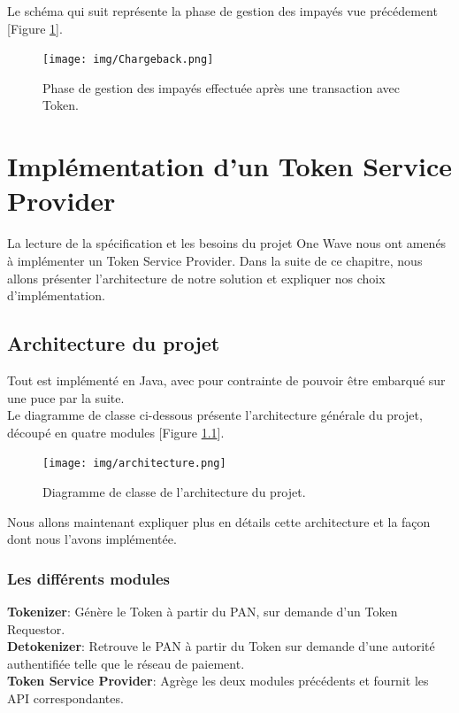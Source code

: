 \documentclass{report}
\begin{document}
\noindent
Le schéma qui suit représente la phase de gestion des impayés vue précédement [Figure \ref{Impayes}].

\begin{figure}[!ht]
    \centering
			\texttt{[image: img/Chargeback.png]}
			\caption{\label{Impayes} Phase de gestion des impayés effectuée après une transaction avec Token.}			
\end{figure}



\chapter{Implémentation d'un Token Service Provider}
La lecture de la spécification et les besoins du projet One Wave nous ont amenés à implémenter un Token Service Provider. Dans la suite de ce chapitre, nous allons présenter l'architecture de notre solution et expliquer nos choix d'implémentation.

\section{Architecture du projet}
Tout est implémenté en Java, avec pour contrainte de pouvoir être embarqué sur une puce par la suite.\\
Le diagramme de classe ci-dessous présente l'architecture générale du projet, découpé en quatre modules [Figure \ref{Architecture}].

\begin{figure}[!ht]
    \centering
			\texttt{[image: img/architecture.png]}
			\caption{\label{Architecture} Diagramme de classe de l'architecture du projet.}			
\end{figure}

\noindent
Nous allons maintenant expliquer plus en détails cette architecture et la façon dont nous l'avons implémentée.

\subsection{Les différents modules}
\noindent
\textbf{Tokenizer}: Génère le Token à partir du PAN, sur demande d'un Token Requestor.\\

\noindent
\textbf{Detokenizer}: Retrouve le PAN à partir du Token sur demande d'une autorité authentifiée telle que le réseau de paiement.\\

\noindent
\textbf{Token Service Provider}: Agrège les deux modules précédents et fournit les API correspondantes.\\
\end{document}

